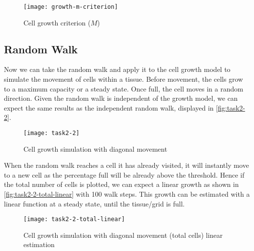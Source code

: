 \begin{figure}[ht]
    \centering
    \texttt{[image: growth-m-criterion]}
    \caption[Cell growth criterion ($M$)]{Cell growth criterion ($M$) }
    \label{fig:growth-m-criterion}
\end{figure}


\clearpage

\subsection{Random Walk}

Now we can take the random walk and apply it to the cell growth model to simulate the movement of cells within a tissue.
Before movement, the cells grow to a maximum capacity or a steady state. Once full, the cell moves in a random direction.
Given the random walk is independent of the growth model, we can expect the same results as the independent random walk, displayed in \autoref{fig:task2-2}.

\begin{figure}[ht]
    \centering
    \texttt{[image: task2-2]}
    \caption[Cell growth simulation with diagonal movement]{Cell growth simulation with diagonal movement}
    \label{fig:task2-2}
\end{figure}

When the random walk reaches a cell it has already visited, it will instantly move to a new cell as the percentage full will be already above the threshold.
Hence if the total number of cells is plotted, we can expect a linear growth as shown in \autoref{fig:task2-2-total-linear} with 100 walk steps.
This growth can be estimated with a linear function at a steady state, until the tissue/grid is full.


\begin{figure}[ht]
    \centering
    \texttt{[image: task2-2-total-linear]}
    \caption[Cell growth simulation with diagonal movement (total cells) linear estimation]{Cell growth simulation with diagonal movement (total cells) linear estimation}
    \label{fig:task2-2-total-linear}
\end{figure}

